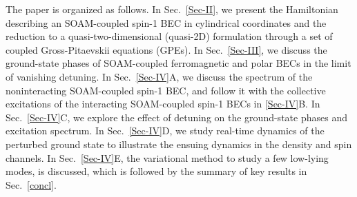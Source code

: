\documentclass[pra,twocolumn,aps,superscriptaddress,showpacs,longbibliography]{revtex4-1}
\begin{document}
The paper is organized as follows. In Sec.~\ref{Sec-II}, we present the Hamiltonian 
describing an SOAM-coupled spin-1 BEC in cylindrical coordinates and the reduction 
to a quasi-two-dimensional (quasi-2D) formulation through a set of coupled Gross-Pitaevskii equations (GPEs). In Sec.~\ref{Sec-III},
we discuss the ground-state phases of SOAM-coupled ferromagnetic and polar BECs in the limit
of vanishing detuning. In Sec.~\ref{Sec-IV}A, we discuss the spectrum of the noninteracting 
SOAM-coupled spin-1 BEC, and follow it with the collective excitations of the interacting SOAM-coupled 
spin-1 BECs in \ref{Sec-IV}B.  In Sec.~\ref{Sec-IV}C, we explore the effect of detuning on the ground-state phases and excitation spectrum.
In Sec.~\ref{Sec-IV}D, we study real-time dynamics of the perturbed 
ground state to illustrate the ensuing dynamics in the density and spin channels. In 
Sec.~\ref{Sec-IV}E, the variational method to study a few low-lying modes, is discussed, which
is followed by the summary of key results in Sec.~\ref{concl}.

\end{document}
